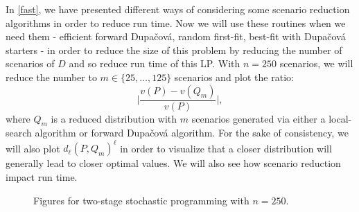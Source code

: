 \documentclass{amsart}
\begin{document}
In \ref{fast}, we have presented different ways of considering some scenario reduction algorithms in order to reduce run time. Now we will use these routines when we need them - efficient forward Dupačová, random first-fit, best-fit with Dupačová starters -  in order to reduce the size of this problem by reducing the number of scenarios of $D$ and so reduce run time of this LP. With $n=250$ scenarios, we will reduce the number to $m\in\{25,\hdots,125\}$ scenarios and plot the ratio: $$\lvert\frac{v(P)-v(Q_m)}{v(P)}\rvert,$$ where $Q_m$ is a reduced distribution with $m$ scenarios generated via either a local-search algorithm or forward Dupačová algorithm. For the sake of consistency, we will also plot $d_\ell\left(P,Q_m\right)^\ell$ in order to visualize that a closer distribution will generally lead to closer optimal values. We will also see how scenario reduction impact run time. 

\begin{figure}[ht]
    \centering
    \hfill
    \hfill
    \caption{Figures for two-stage stochastic programming with $n=250$.}
\end{figure}
\end{document}
